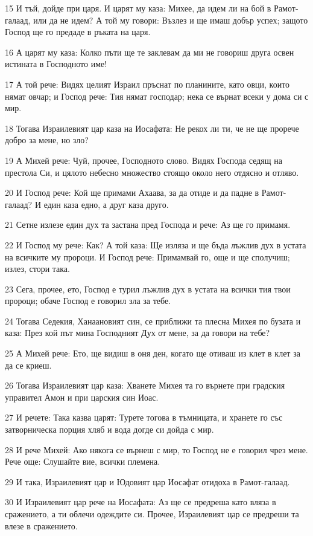 \par 15 И тъй, дойде при царя. И царят му каза: Михее, да идем ли на бой в Рамот-галаад, или да не идем? А той му говори: Възлез и ще имаш добър успех; защото Господ ще го предаде в ръката на царя.
\par 16 А царят му каза: Колко пъти ще те заклевам да ми не говориш друга освен истината в Господното име!
\par 17 А той рече: Видях целият Израил пръснат по планините, като овци, които нямат овчар; и Господ рече: Тия нямат господар; нека се върнат всеки у дома си с мир.
\par 18 Тогава Израилевият цар каза на Иосафата: Не рекох ли ти, че не ще прорече добро за мене, но зло?
\par 19 А Михей рече: Чуй, прочее, Господното слово. Видях Господа седящ на престола Си, и цялото небесно множество стоящо около него отдясно и отляво.
\par 20 И Господ рече: Кой ще примами Ахаава, за да отиде и да падне в Рамот-галаад? И един каза едно, а друг каза друго.
\par 21 Сетне излезе един дух та застана пред Господа и рече: Аз ще го примамя.
\par 22 И Господ му рече: Как? А той каза: Ще изляза и ще бъда лъжлив дух в устата на всичките му пророци. И Господ рече: Примамвай го, още и ще сполучиш; излез, стори така.
\par 23 Сега, прочее, ето, Господ е турил лъжлив дух в устата на всички тия твои пророци; обаче Господ е говорил зла за тебе.
\par 24 Тогава Седекия, Ханаановият син, се приближи та плесна Михея по бузата и каза: През кой път мина Господният Дух от мене, за да говори на тебе?
\par 25 А Михей рече: Ето, ще видиш в оня ден, когато ще отиваш из клет в клет за да се криеш.
\par 26 Тогава Израилевият цар каза: Хванете Михея та го върнете при градския управител Амон и при царския син Иоас.
\par 27 И речете: Така казва царят: Турете тогова в тъмницата, и хранете го със затворническа порция хляб и вода догде си дойда с мир.
\par 28 И рече Михей: Ако някога се върнеш с мир, то Господ не е говорил чрез мене. Рече още: Слушайте вие, всички племена.
\par 29 И така, Израилевият цар и Юдовият цар Иосафат отидоха в Рамот-галаад.
\par 30 И Израилевият цар рече на Иосафата: Аз ще се предреша като вляза в сражението, а ти облечи одеждите си. Прочее, Израилевият цар се предреши та влезе в сражението.
